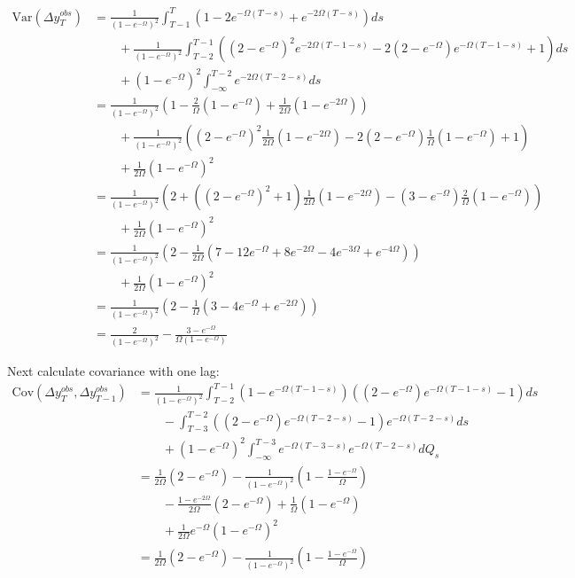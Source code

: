 \begin{align*}
\mathrm{Var}(\Delta y_T^{obs}) &= \frac{1}{(1-e^{-\Omega})^2}\int_{T-1}^{T} ( 1 - 2e^{-\Omega (T-s)}  + e^{-2\Omega (T-s)}) ds \\
& \qquad + \frac{1}{(1-e^{-\Omega})^2} \int_{T-2}^{T-1}\left( (2-e^{-\Omega})^2 e^{-2\Omega (T-1-s)} -2(2-e^{-\Omega}) e^{-\Omega (T-1-s)} +1  \right)ds \\
& \qquad + (1-e^{-\Omega})^2 \int_{-\infty}^{T-2}  e^{-2\Omega (T-2-s)} ds \\
&= \frac{1}{(1-e^{-\Omega})^2}\left( 1 - \frac{2}{\Omega}(1-e^{-\Omega})    + \frac{1}{2\Omega}(1-e^{-2\Omega}) \right) \\
& \qquad + \frac{1}{(1-e^{-\Omega})^2}\left( (2-e^{-\Omega})^2\frac{1}{2\Omega}(1-e^{-2\Omega}) -2(2-e^{-\Omega}) \frac{1}{\Omega}(1-e^{-\Omega}) +1  \right) \\
& \qquad +  \frac{1}{2\Omega}(1-e^{-\Omega})^2 \\
&= \frac{1}{(1-e^{-\Omega})^2}\left( 2    + \left( (2-e^{-\Omega})^2 +1\right)\frac{1}{2\Omega}(1-e^{-2\Omega}) -(3-e^{-\Omega}) \frac{2}{\Omega}(1-e^{-\Omega})   \right) \\
& \qquad +  \frac{1}{2\Omega}(1-e^{-\Omega})^2 \\
&=  \frac{1}{(1-e^{-\Omega})^2}\left( 2   - \frac{1}{2\Omega}\left( 7 -12e^{-\Omega} +8e^{-2\Omega} -4e^{-3\Omega} + e^{-4\Omega} \right) \right) \\
& \qquad +  \frac{1}{2\Omega}(1-e^{-\Omega})^2 \\
&=  \frac{1}{(1-e^{-\Omega})^2}\left( 2   - \frac{1}{\Omega}\left( 3 -4e^{-\Omega} +e^{-2\Omega}  \right) \right)\\
&=  \frac{2}{(1-e^{-\Omega})^2}   - \frac{ 3 -e^{-\Omega}}{\Omega(1-e^{-\Omega})}
\end{align*}


Next calculate covariance with one lag:
\begin{align*}
\mathrm{Cov}(\Delta y_T^{obs},\Delta y_{T-1}^{obs}) 
&=\frac{1}{(1-e^{-\Omega})^2}\int_{T-2}^{T-1}  ( 1 - e^{-\Omega (T-1-s)} ) \left( (2-e^{-\Omega}) e^{-\Omega (T-1-s)} -1  \right) ds \\
& \qquad - \int_{T-3}^{T-2}\left( (2-e^{-\Omega}) e^{-\Omega (T-2-s)} -1  \right) e^{-\Omega (T-2-s)} ds \\
& \qquad +  (1-e^{-\Omega})^2 \int_{-\infty}^{T-3}  e^{-\Omega (T-3-s)}  e^{-\Omega (T-2-s)} dQ_s \\
&=   \frac{1}{2\Omega}(2-e^{-\Omega}) - \frac{1}{(1-e^{-\Omega})^2}( 1 - \frac{1-e^{-\Omega}}{\Omega}) \\
& \qquad - \frac{1-e^{-2\Omega}}{2\Omega}\left( 2- e^{-\Omega} \right) + \frac{1}{\Omega}(1-e^{-\Omega}) \\
& \qquad +  \frac{1 }{2\Omega} e^{-\Omega}(1-e^{-\Omega})^2 \\
&=   \frac{1}{2\Omega}(2-e^{-\Omega}) - \frac{1}{(1-e^{-\Omega})^2}( 1 - \frac{1-e^{-\Omega}}{\Omega})
\end{align*}





